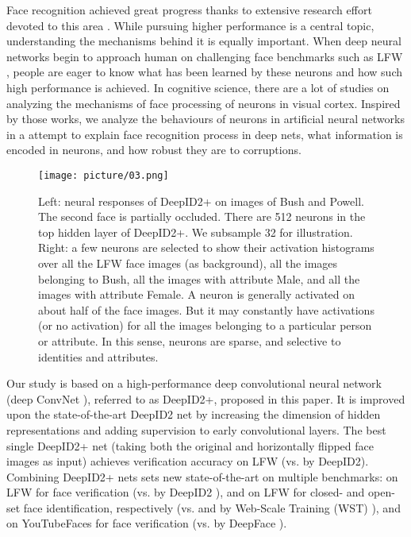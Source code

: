\documentclass[10pt,twocolumn,letterpaper]{article}
\begin{document}
Face recognition  achieved great progress thanks to extensive research effort devoted to this area \cite{wright2009,taigman2009,kumar2009,huang2011,berg2012,chen2012,huang2012,simonyan2013,chen2013,cao2013,sun2013b,taigman2014a,sun2014a,taigman2014b,sun2014b}. While pursuing higher performance is a central topic, understanding the mechanisms behind it is equally important. When deep neural networks begin to approach  human on challenging face benchmarks \cite{taigman2014a,sun2014a,taigman2014b,sun2014b} such as LFW \cite{huang2007a}, people are eager to know what has been learned by these neurons and how such high performance is achieved. In cognitive science, there are a lot of studies  \cite{tsao2008} on analyzing the mechanisms of face processing of neurons in  visual cortex. Inspired by those works,  we analyze the behaviours of neurons in artificial neural networks in a attempt to explain  face recognition process in deep nets, what information is encoded in  neurons, and how robust they are to  corruptions.

\begin{figure}[t]
\begin{center}
\texttt{[image: picture/03.png]}
\end{center}
\vspace{-0.15in}
\caption{Left: neural responses of DeepID2+ on images of Bush and Powell.  The second face is partially occluded. There are 512 neurons in the top hidden layer of DeepID2+. We subsample 32 for illustration. Right: a few neurons are selected to show their activation histograms over all the LFW face images (as background), all the images belonging to Bush, all the images with attribute Male, and all the images with attribute Female. A neuron is generally activated on about half of the face images. But it may constantly have activations (or no activation) for all the images belonging to a particular person or attribute.  In this sense, neurons are sparse, and selective to identities and attributes. }
\label{fig:demo}
\vspace{-0.1in}
\end{figure}

Our study is based on a high-performance deep convolutional neural network (deep ConvNet \cite{lecun1989,lecun1998}), referred to as DeepID2+, proposed in this paper. It is improved upon the  state-of-the-art DeepID2 net \cite{sun2014b} by increasing the dimension of hidden representations and adding  supervision to early convolutional layers. The best single DeepID2+ net (taking both the original and horizontally flipped face images as input) achieves  verification accuracy on LFW (vs.  by DeepID2). Combining  DeepID2+ nets sets new state-of-the-art on multiple benchmarks:   on LFW for face verification (vs.  by DeepID2 \cite{sun2014b}),   and  on LFW for closed- and open-set face identification, respectively (vs.  and  by Web-Scale Training (WST) \cite{taigman2014b}), and  on YouTubeFaces \cite{wolf2011} for face verification (vs.  by DeepFace \cite{taigman2014a}).
\end{document}
